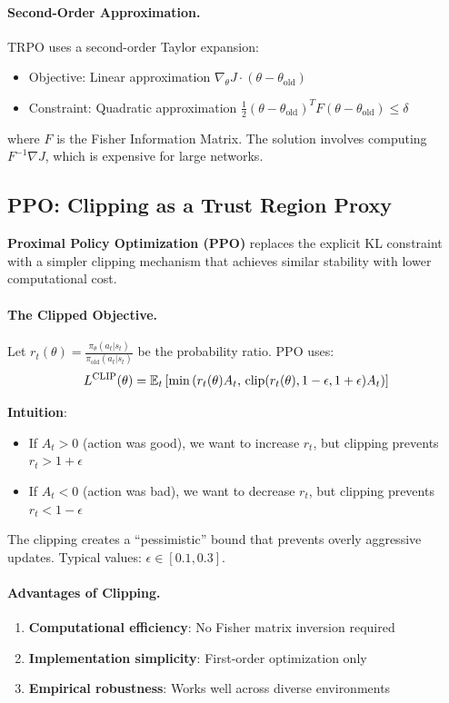 \paragraph{Second-Order Approximation.}
TRPO uses a second-order Taylor expansion:
\begin{itemize}
    \item Objective: Linear approximation $\nabla_\theta J \cdot (\theta - \theta_{\text{old}})$
    \item Constraint: Quadratic approximation $\frac{1}{2}(\theta - \theta_{\text{old}})^T F (\theta - \theta_{\text{old}}) \le \delta$
\end{itemize}
where $F$ is the Fisher Information Matrix. The solution involves computing $F^{-1} \nabla J$, which is expensive for large networks.

\subsection{PPO: Clipping as a Trust Region Proxy}

\textbf{Proximal Policy Optimization (PPO)} \citep{schulman2017proximal} replaces the explicit KL constraint with a simpler clipping mechanism that achieves similar stability with lower computational cost.

\paragraph{The Clipped Objective.}
Let $r_t(\theta) = \frac{\pi_\theta(a_t|s_t)}{\pi_{\text{old}}(a_t|s_t)}$ be the probability ratio. PPO uses:
\begin{equation}
L^{\text{CLIP}}(\theta) = \mathbb{E}_t \left[ \min\left( r_t(\theta) A_t, \, \text{clip}(r_t(\theta), 1-\epsilon, 1+\epsilon) A_t \right) \right]
\end{equation}

\textbf{Intuition}: 
\begin{itemize}
    \item If $A_t > 0$ (action was good), we want to increase $r_t$, but clipping prevents $r_t > 1 + \epsilon$
    \item If $A_t < 0$ (action was bad), we want to decrease $r_t$, but clipping prevents $r_t < 1 - \epsilon$
\end{itemize}
The clipping creates a ``pessimistic'' bound that prevents overly aggressive updates. Typical values: $\epsilon \in [0.1, 0.3]$.

\paragraph{Advantages of Clipping.}
\begin{enumerate}
    \item \textbf{Computational efficiency}: No Fisher matrix inversion required
    \item \textbf{Implementation simplicity}: First-order optimization only
    \item \textbf{Empirical robustness}: Works well across diverse environments
\end{enumerate}

